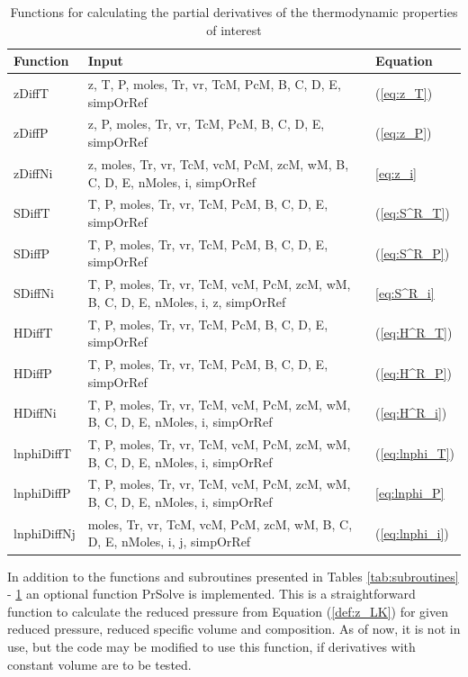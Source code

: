 \documentclass[internal,english]{sintefmemo2012}
\numberwithin{equation}{section}
\newcommand*{\reff}[1]{(\ref{#1})}
\begin{document}
\begin{table}[t]
\begin{center}
\caption{Functions for calculating the partial derivatives of the thermodynamic properties of interest}
\label{tab:functionsTherm}
\begin{tabular}{l p{10cm} l}
\hline%
Function 	& Input   & Equation \\
\hline
zDiffT		& z, T, P, moles, Tr, vr, TcM, PcM, B, C, D, E, simpOrRef	& \reff{eq:z_T} \\
zDiffP		& z, P, moles, Tr, vr, TcM, PcM, B, C, D, E, simpOrRef	& \reff{eq:z_P} \\
zDiffNi		& z, moles, Tr, vr, TcM, vcM, PcM, zcM, wM, B, C, D, E, nMoles, i, simpOrRef	& \ref{eq:z_i} \\
SDiffT		& T, P, moles, Tr, vr, TcM, PcM, B, C, D, E, simpOrRef	& \reff{eq:S^R_T} \\
SDiffP		& T, P, moles, Tr, vr, TcM, PcM, B, C, D, E, simpOrRef	& \reff{eq:S^R_P} \\
SDiffNi		& T, P, moles, Tr, vr, TcM, vcM, PcM, zcM, wM, B, C, D, E, nMoles, i, z, simpOrRef	& \ref{eq:S^R_i} \\
HDiffT		& T, P, moles, Tr, vr, TcM, PcM, B, C, D, E, simpOrRef	& \reff{eq:H^R_T} \\
HDiffP		& T, P, moles, Tr, vr, TcM, PcM, B, C, D, E, simpOrRef	& \reff{eq:H^R_P} \\
HDiffNi		& T, P, moles, Tr, vr, TcM, vcM, PcM, zcM, wM, B, C, D, E, nMoles, i, simpOrRef	& \reff{eq:H^R_i} \\
lnphiDiffT	& T, P, moles, Tr, vr, TcM, vcM, PcM, zcM, wM, B, C, D, E, nMoles, i, simpOrRef	& \reff{eq:lnphi_T} \\
lnphiDiffP	& T, P, moles, Tr, vr, TcM, vcM, PcM, zcM, wM, B, C, D, E, nMoles, i, simpOrRef	& \ref{eq:lnphi_P} \\
lnphiDiffNj	& moles, Tr, vr, TcM, vcM, PcM, zcM, wM, B, C, D, E, nMoles, i, j, simpOrRef	& \reff{eq:lnphi_i} \\
\hline
\end{tabular}
\end{center}
\end{table}
\clearpage
In addition to the functions and subroutines presented in Tables \ref{tab:subroutines} - \ref{tab:functionsTherm} an optional function PrSolve is implemented. This is a straightforward function to calculate the reduced pressure from Equation \reff{def:z_LK} for given reduced pressure, reduced specific volume and composition. As of now, it is not in use, but the code may be modified to use this function, if derivatives with constant volume are to be tested.
\end{document}
